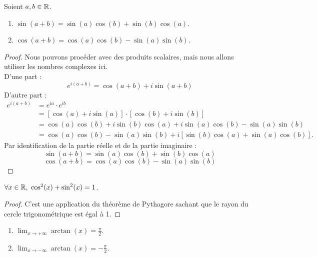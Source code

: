 \begin{proposition}
	Soient $a, b \in \mathbb{R}$.
        \begin{enumerate}
            \item $\sin(a + b) = \sin(a) \cos(b) + \sin(b) \cos(a)$.
            \item $\cos(a + b) = \cos(a) \cos(b) - \sin(a) \sin(b)$.
        \end{enumerate}
\end{proposition}

\begin{proof}
    Nous pouvons procéder avec des produits scalaires, mais nous allons utiliser les nombres complexes ici.
    \\
    D'une part :
    \[e^{i (a + b)} = \cos(a + b) + i\sin(a + b)\]
    D'autre part :
    \begin{align*}
        e^{i (a + b)} &= e^{ia} \cdot e^{ib} \\
        &= [\cos(a) + i \sin(a)] \cdot [\cos(b) + i \sin(b)] \\
        &= \cos(a) \cos(b) + i\sin(b)\cos(a) + i\sin(a)\cos(b) - \sin(a)\sin(b) \\
        &= \cos(a)\cos(b) - \sin(a)\sin(b) + i [\sin(b)\cos(a) + \sin(a) \cos(b)].
    \end{align*}
    Par identification de la partie réelle et de la partie imaginaire :
    \[ \sin(a + b) = \sin(a) \cos(b) + \sin(b) \cos(a) \]
	\[ \cos(a + b) = \cos(a) \cos(b) - \sin(a) \sin(b) \]
\end{proof}

\begin{proposition}
    $\forall x \in \mathbb{R},\ \cos^2(x) + \sin^2(x) = 1$.
\end{proposition}

\begin{proof}
    C'est une application du théorème de Pythagore sachant que le rayon du cercle trigonométrique est égal à 1.
\end{proof}

\begin{proposition}
	
    \begin{enumerate}
        \item $\lim_{x \to +\infty} \arctan(x) = \frac{\pi}{2}$.
        \item $\lim_{x \to -\infty} \arctan(x) = -\frac{\pi}{2}$.
    \end{enumerate}
\end{proposition}

